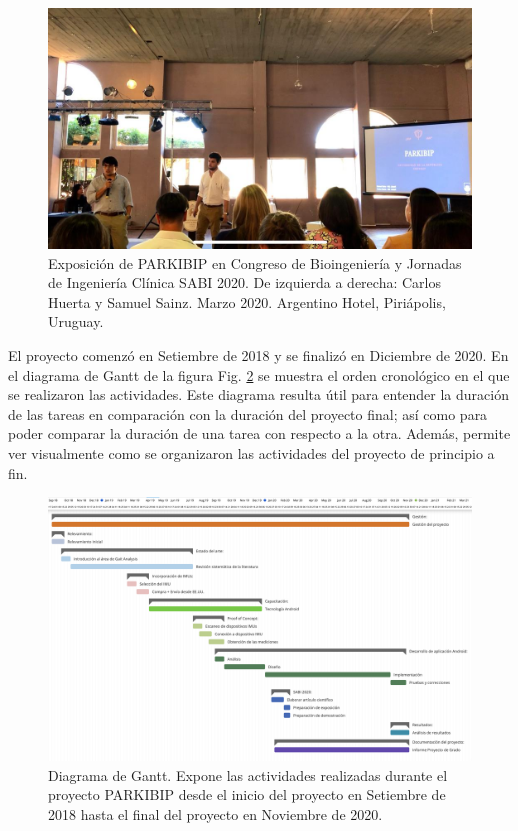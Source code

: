 \newpage

\begin{figure}[H]
\includegraphics[width=\textwidth]{TESIS/imagenes/chap07/SABI-2020.jpeg}
\caption{ Exposición de PARKIBIP en Congreso de Bioingeniería y Jornadas de Ingeniería Clínica SABI 2020. De izquierda a derecha: Carlos Huerta y Samuel Sainz. Marzo 2020. Argentino Hotel, Piriápolis, Uruguay. }
\label{fig:sabi2020}
\end{figure}

El proyecto comenzó en Setiembre de 2018 y se finalizó en Diciembre de 2020. En el diagrama de Gantt de la figura Fig. \ref{fig:gantt-parkibip} se muestra el orden cronológico en el que se realizaron las actividades. Este diagrama resulta útil para entender la duración de las tareas en comparación con la duración del proyecto final; así como para poder comparar la duración de una tarea con respecto a la otra. Además, permite ver visualmente como se organizaron las actividades del proyecto de principio a fin. 

\newpage

\begin{figure}[H]
\hspace{-3.0cm}
\includegraphics[clip,width=1.32 \columnwidth]{TESIS/imagenes/chap07/gantt-parkibip.png}
\caption{Diagrama de Gantt. Expone las actividades realizadas durante el proyecto PARKIBIP desde el inicio del proyecto en Setiembre de 2018 hasta el final del proyecto en Noviembre de 2020. }
\label{fig:gantt-parkibip}
\end{figure}

